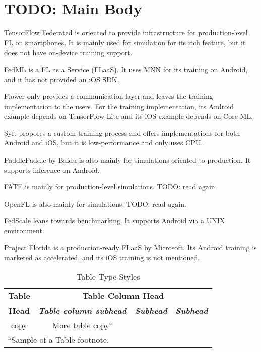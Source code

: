 \documentclass[conference]{IEEEtran}
\begin{document}
\section{TODO: Main Body}

TensorFlow Federated \cite{tensorflow2015-whitepaper} is oriented to
provide infrastructure for production-level FL on smartphones.
It is mainly used for simulation for its rich feature,
but it does not have on-device training support.

FedML \cite{he2020fedml} is a FL as a Service (FLaaS).
It uses MNN for its training on Android,
and it has not provided an iOS SDK.

Flower \cite{beutel2020flower,mathur2021ondevice}
only provides a communication layer and
leaves the training implementation to the users.
For the training implementation,
its Android example depends on TensorFlow Lite and
its iOS example depends on Core ML.

Syft \cite{ryffel2018generic,Ziller2021,hall2021syft}
proposes a custom training process and
offers implementations for both Android and iOS,
but it is low-performance and only uses CPU.

PaddlePaddle \cite{ma2019paddlepaddle} by Baidu is
also mainly for simulations oriented to production.
It supports inference on Android.

FATE \cite{liu2021fate} is mainly for production-level simulations.
TODO: read again.

OpenFL \cite{patrick2022openfl} is also mainly for simulations.
TODO: read again.

FedScale \cite{lai2022fedscale} leans towards benchmarking.
It supports Android via a UNIX environment.

Project Florida \cite{madrigal2023project}
is a production-ready FLaaS by Microsoft.
Its Android training is marketed as accelerated,
and its iOS training is not mentioned.


\begin{table}[htbp]
\caption{Table Type Styles}
\begin{center}
\begin{tabular}{|c|c|c|c|}
\hline
\textbf{Table}&\multicolumn{3}{|c|}{\textbf{Table Column Head}} \\
\cline{2-4} 
\textbf{Head} & \textbf{\textit{Table column subhead}}& \textbf{\textit{Subhead}}& \textbf{\textit{Subhead}} \\
\hline
copy& More table copy$^{\mathrm{a}}$& &  \\
\hline
\multicolumn{4}{l}{$^{\mathrm{a}}$Sample of a Table footnote.}
\end{tabular}
\label{tab1}
\end{center}
\end{table}
\end{document}
